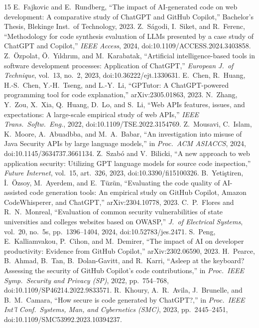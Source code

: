 \documentclass[conference]{IEEEtran}
\begin{document}
\begin{thebibliography}{15}
 E.~Fajkovic and E.~Rundberg, ``The impact of AI-generated code on web development: A comparative study of ChatGPT and GitHub Copilot,'' Bachelor's Thesis, Blekinge Inst.\ of Technology, 2023.
 Z.~S\'agodi, I.~Siket, and R.~Ferenc, ``Methodology for code synthesis evaluation of LLMs presented by a case study of ChatGPT and Copilot,'' \emph{IEEE Access}, 2024, doi:10.1109/ACCESS.2024.3403858.
 Z.~\"Ozpolat, \"O.~Y\i ld\i r\i m, and M.~Karabatak, ``Artificial intelligence-based tools in software development processes: Application of ChatGPT,'' \emph{European J.\ of Technique}, vol.~13, no.~2, 2023, doi:10.36222/ejt.1330631.
 E.~Chen, R.~Huang, H.-S.~Chen, Y.-H.~Tseng, and L.-Y.~Li, ``GPTutor: A ChatGPT-powered programming tool for code explanation,'' arXiv:2305.01863, 2023.
 N.~Zhang, Y.~Zou, X.~Xia, Q.~Huang, D.~Lo, and S.~Li, ``Web APIs features, issues, and expectations: A large-scale empirical study of web APIs,'' \emph{IEEE Trans.\ Softw.\ Eng.}, 2022, doi:10.1109/TSE.2022.3154769.
 Z.~Mousavi, C.~Islam, K.~Moore, A.~Abuadbba, and M.~A.~Babar, ``An investigation into misuse of Java Security APIs by large language models,'' in \emph{Proc.\ ACM ASIACCS}, 2024, doi:10.1145/3634737.3661134.
 Z.~Szab\'o and V.~Bilicki, ``A new approach to web application security: Utilizing GPT language models for source code inspection,'' \emph{Future Internet}, vol.~15, art.~326, 2023, doi:10.3390/fi15100326.
 B.~Yeti\c stiren, \.I.~\"Ozsoy, M.~Ayerdem, and E.~T\"uz\"un, ``Evaluating the code quality of AI-assisted code generation tools: An empirical study on GitHub Copilot, Amazon CodeWhisperer, and ChatGPT,'' arXiv:2304.10778, 2023.
 C.~P.~Flores and R.~N.~Monreal, ``Evaluation of common security vulnerabilities of state universities and colleges websites based on OWASP,'' \emph{J.\ of Electrical Systems}, vol.~20, no.~5s, pp.~1396--1404, 2024, doi:10.52783/jes.2471.
 S.~Peng, E.~Kalliamvakou, P.~Cihon, and M.~Demirer, ``The impact of AI on developer productivity: Evidence from GitHub Copilot,'' arXiv:2302.06590, 2023.
 H.~Pearce, B.~Ahmad, B.~Tan, B.~Dolan-Gavitt, and R.~Karri, ``Asleep at the keyboard? Assessing the security of GitHub Copilot's code contributions,'' in \emph{Proc.\ IEEE Symp.\ Security and Privacy (SP)}, 2022, pp.~754--768, doi:10.1109/SP46214.2022.9833571.
 R.~Khoury, A.~R.~Avila, J.~Brunelle, and B.~M.~Camara, ``How secure is code generated by ChatGPT?,'' in \emph{Proc.\ IEEE Int'l Conf.\ Systems, Man, and Cybernetics (SMC)}, 2023, pp.~2445--2451, doi:10.1109/SMC53992.2023.10394237.

\end{thebibliography}
\end{document}
